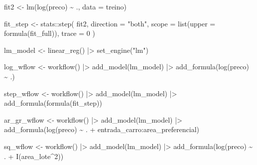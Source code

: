 \documentclass[
  letterpaper,
  DIV=11,
  numbers=noendperiod]{scrartcl}
\newenvironment{Shaded}{\begin{snugshade}}{\end{snugshade}}
\newcommand{\AttributeTok}[1]{\textcolor[rgb]{0.40,0.45,0.13}{#1}}
\newcommand{\DecValTok}[1]{\textcolor[rgb]{0.68,0.00,0.00}{#1}}
\newcommand{\FunctionTok}[1]{\textcolor[rgb]{0.28,0.35,0.67}{#1}}
\newcommand{\NormalTok}[1]{\textcolor[rgb]{0.00,0.23,0.31}{#1}}
\newcommand{\OtherTok}[1]{\textcolor[rgb]{0.00,0.23,0.31}{#1}}
\newcommand{\SpecialCharTok}[1]{\textcolor[rgb]{0.37,0.37,0.37}{#1}}
\newcommand{\StringTok}[1]{\textcolor[rgb]{0.13,0.47,0.30}{#1}}
\begin{document}
\begin{Shaded}
\begin{Highlighting}[]
\NormalTok{fit2 }\OtherTok{\textless{}{-}} \FunctionTok{lm}\NormalTok{(}\FunctionTok{log}\NormalTok{(preco) }\SpecialCharTok{\textasciitilde{}}\NormalTok{ ., }\AttributeTok{data =}\NormalTok{ treino)}

\NormalTok{fit\_step }\OtherTok{\textless{}{-}}\NormalTok{ stats}\SpecialCharTok{::}\FunctionTok{step}\NormalTok{(}
\NormalTok{  fit2,}
  \AttributeTok{direction =} \StringTok{"both"}\NormalTok{,}
  \AttributeTok{scope =} \FunctionTok{list}\NormalTok{(}\AttributeTok{upper =} \FunctionTok{formula}\NormalTok{(fit\_full)),}
  \AttributeTok{trace =} \DecValTok{0}
\NormalTok{)}

\NormalTok{lm\_model }\OtherTok{\textless{}{-}} \FunctionTok{linear\_reg}\NormalTok{() }\SpecialCharTok{|\textgreater{}}
  \FunctionTok{set\_engine}\NormalTok{(}\StringTok{"lm"}\NormalTok{)}

\NormalTok{log\_wflow }\OtherTok{\textless{}{-}} \FunctionTok{workflow}\NormalTok{() }\SpecialCharTok{|\textgreater{}}
  \FunctionTok{add\_model}\NormalTok{(lm\_model) }\SpecialCharTok{|\textgreater{}}
  \FunctionTok{add\_formula}\NormalTok{(}\FunctionTok{log}\NormalTok{(preco) }\SpecialCharTok{\textasciitilde{}}\NormalTok{ .)}

\NormalTok{step\_wflow }\OtherTok{\textless{}{-}} \FunctionTok{workflow}\NormalTok{() }\SpecialCharTok{|\textgreater{}}
  \FunctionTok{add\_model}\NormalTok{(lm\_model) }\SpecialCharTok{|\textgreater{}}
  \FunctionTok{add\_formula}\NormalTok{(}\FunctionTok{formula}\NormalTok{(fit\_step))}

\NormalTok{ar\_gr\_wflow }\OtherTok{\textless{}{-}} \FunctionTok{workflow}\NormalTok{() }\SpecialCharTok{|\textgreater{}}
  \FunctionTok{add\_model}\NormalTok{(lm\_model) }\SpecialCharTok{|\textgreater{}}
  \FunctionTok{add\_formula}\NormalTok{(}\FunctionTok{log}\NormalTok{(preco) }\SpecialCharTok{\textasciitilde{}}\NormalTok{ . }\SpecialCharTok{+}\NormalTok{ entrada\_carro}\SpecialCharTok{:}\NormalTok{area\_preferencial)}

\NormalTok{sq\_wflow }\OtherTok{\textless{}{-}} \FunctionTok{workflow}\NormalTok{() }\SpecialCharTok{|\textgreater{}}
  \FunctionTok{add\_model}\NormalTok{(lm\_model) }\SpecialCharTok{|\textgreater{}}
  \FunctionTok{add\_formula}\NormalTok{(}\FunctionTok{log}\NormalTok{(preco) }\SpecialCharTok{\textasciitilde{}}\NormalTok{ . }\SpecialCharTok{+} \FunctionTok{I}\NormalTok{(area\_lote}\SpecialCharTok{\^{}}\DecValTok{2}\NormalTok{))}


\end{Highlighting}
\end{Shaded}
\end{document}

